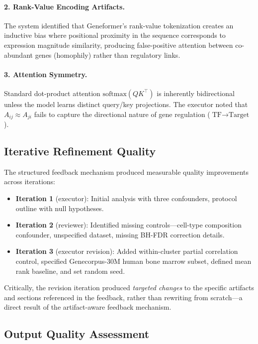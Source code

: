 \documentclass[11pt,a4paper]{article}
\begin{document}
\paragraph{2. Rank-Value Encoding Artifacts.}
The system identified that Geneformer's rank-value tokenization creates an inductive bias where positional proximity in the sequence corresponds to expression magnitude similarity, producing false-positive attention between co-abundant genes (homophily) rather than regulatory links.

\paragraph{3. Attention Symmetry.}
Standard dot-product attention $\text{softmax}(QK^\top)$ is inherently bidirectional unless the model learns distinct query/key projections.
The executor noted that $A_{ij} \approx A_{ji}$ fails to capture the directional nature of gene regulation ($\text{TF} \to \text{Target}$).

\subsection{Iterative Refinement Quality}

The structured feedback mechanism produced measurable quality improvements across iterations:

\begin{itemize}[leftmargin=*]
  \item \textbf{Iteration 1} (executor): Initial analysis with three confounders, protocol outline with null hypotheses.
  \item \textbf{Iteration 2} (reviewer): Identified missing controls---cell-type composition confounder, unspecified dataset, missing BH-FDR correction details.
  \item \textbf{Iteration 3} (executor revision): Added within-cluster partial correlation control, specified Genecorpus-30M human bone marrow subset, defined mean rank baseline, and set random seed.
\end{itemize}

Critically, the revision iteration produced \emph{targeted changes} to the specific artifacts and sections referenced in the feedback, rather than rewriting from scratch---a direct result of the artifact-aware feedback mechanism.

\subsection{Output Quality Assessment}
\end{document}

